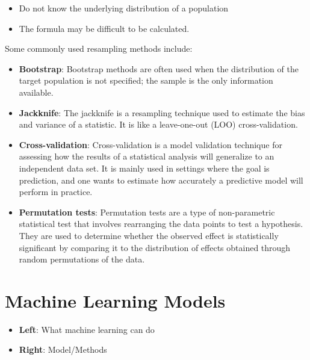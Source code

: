 \documentclass[
  letterpaper,
  DIV=11,
  numbers=noendperiod]{scrreprt}
\begin{document}
\begin{itemize}
\item
  Do not know the underlying distribution of a population
\item
  The formula may be difficult to be calculated.
\end{itemize}

Some commonly used resampling methods include:

\begin{itemize}
\item
  \textbf{Bootstrap}: Bootstrap methods are often used when the
  distribution of the target population is not specified; the sample is
  the only information available.
\item
  \textbf{Jackknife}: The jackknife is a resampling technique used to
  estimate the bias and variance of a statistic. It is like a
  leave-one-out (LOO) cross-validation.
\item
  \textbf{Cross-validation}: Cross-validation is a model validation
  technique for assessing how the results of a statistical analysis will
  generalize to an independent data set. It is mainly used in settings
  where the goal is prediction, and one wants to estimate how accurately
  a predictive model will perform in practice.
\item
  \textbf{Permutation tests}: Permutation tests are a type of
  non-parametric statistical test that involves rearranging the data
  points to test a hypothesis. They are used to determine whether the
  observed effect is statistically significant by comparing it to the
  distribution of effects obtained through random permutations of the
  data.
\end{itemize}

\section{Machine Learning Models}\label{machine-learning-models}

\begin{itemize}
\item
  \textbf{Left}: What machine learning can do
\item
  \textbf{Right}: Model/Methods
\end{itemize}
\end{document}
